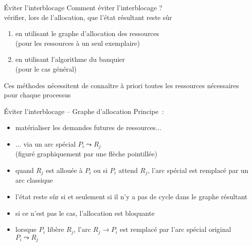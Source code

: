 \begin {frame} {Éviter l'interblocage}
    Comment éviter l'interblocage ? \\
    \implique vérifier, lors de l'allocation, que l'état résultant
    reste sûr

    \begin {enumerate}
	\item en utilisant le graphe d'allocation des ressources \\
	    (pour les ressources à un seul exemplaire)
	\item en utilisant l'algorithme du banquier \\
	    (pour le cas général)
    \end {enumerate}

    \vspace* {3mm}

    Ces méthodes nécessitent de connaître à priori toutes les
    ressources nécessaires pour chaque processus

\end {frame}

\begin {frame} {Éviter l'interblocage -- Graphe d'allocation}
    Principe~:

    \begin {itemize}
	\item matérialiser les demandes futures de ressources...
	\item ... via un arc spécial $P_i \leadsto R_j$
	    \\
	    (figuré graphiquement par une flèche pointillée)
	\item quand $R_j$ est allouée à $P_i$ ou si $P_i$ attend $R_j$,
	    l'arc spécial est remplacé par un arc classique
	\item l'état reste sûr si et seulement si il n'y a pas de
	    cycle dans le graphe résultant
	\item si ce n'est pas le cas, l'allocation est bloquante
	\item lorsque $P_i$ libère $R_j$, l'arc $R_j \rightarrow P_i$
	    est remplacé par l'arc spécial original $P_i \leadsto R_j$

    \end {itemize}
\end {frame}

